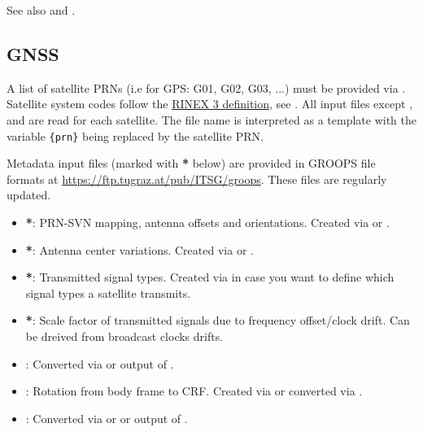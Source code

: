 See also  and .


\subsection{GNSS}\label{gnssTransmitterGeneratorType:gnss}
A list of satellite PRNs (i.e for GPS: G01, G02, G03, ...) must be provided via
. Satellite system codes follow the
\href{https://files.igs.org/pub/data/format/rinex305.pdf}{RINEX 3 definition}, see .
All input files except ,
and  are read for each satellite.
The file name is interpreted as a template with the variable \verb|{prn}| being replaced by the satellite PRN.

Metadata input files (marked with \textbf{*} below) are provided in GROOPS file formats at
\url{https://ftp.tugraz.at/pub/ITSG/groops}. These files are regularly updated.
\begin{itemize}
  \item {}\textbf{*}:
        PRN-SVN mapping, antenna offsets and orientations.
        Created via  or .
  \item {}\textbf{*}:
        Antenna center variations.
        Created via  or .
  \item {}\textbf{*}:
        Transmitted signal types.
        Created via  in case you want to define which signal
        types a satellite transmits.
  \item {}\textbf{*}:
        Scale factor of transmitted signals due to frequency offset/clock drift.
        Can be dreived from broadcast clocks drifts.
  \item {}: Converted via  or
        output of .
  \item {}:
        Rotation from body frame to CRF. Created via  or converted via .
  \item {}:
        Converted via  or  or
        output of .
\end{itemize}


